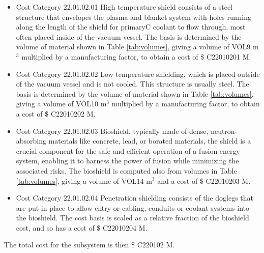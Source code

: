 \begin{itemize}
    \item Cost Category 22.01.02.01 High temperature shield consists of a steel structure that envelopes the plasma and blanket system with holes running along the length of the shield for primaryC coolant to flow through, most often placed inside of the vacuum vessel. The basis is determined by the volume of material shown in Table \ref{tab:volumes}, giving a volume of VOL9  m$^{3}$ multiplied by a manufacturing factor, to obtain a cost of \$ C22010201 M. %
    \item Cost Category 22.01.02.02 Low temperature shielding, which is placed outside of the vacuum vessel and is not cooled.  This structure is usually steel.  The basis is determined by the volume of material shown in Table \ref{tab:volumes}, giving a volume of VOL10  m$^{3}$ multiplied by a manufacturing factor, to obtain a cost of \$ C22010202 M.
    \item Cost Category 22.01.02.03 Bioshield, typically made of dense, neutron-absorbing materials like concrete, lead, or borated materials, the shield is a crucial component for the safe and efficient operation of a fusion energy system, enabling it to harness the power of fusion while minimizing the associated risks.  The bioshield is computed also from volumes in Table \ref{tab:volumes}, giving a volume of VOL14 m$^{3}$ and a cost of \$ C22010203 M. 
    \item Cost Category 22.01.02.04 Penetration shielding consists of the doglegs that are put in place to allow entry or cabling, conduits or coolant systems into the bioshield.  The cost basis is scaled as a relative fraction of the bioshield cost, and so has a cost of \$ C22010204 M.
\end{itemize}

The total cost for the subsystem is then \$ C220102 M.




